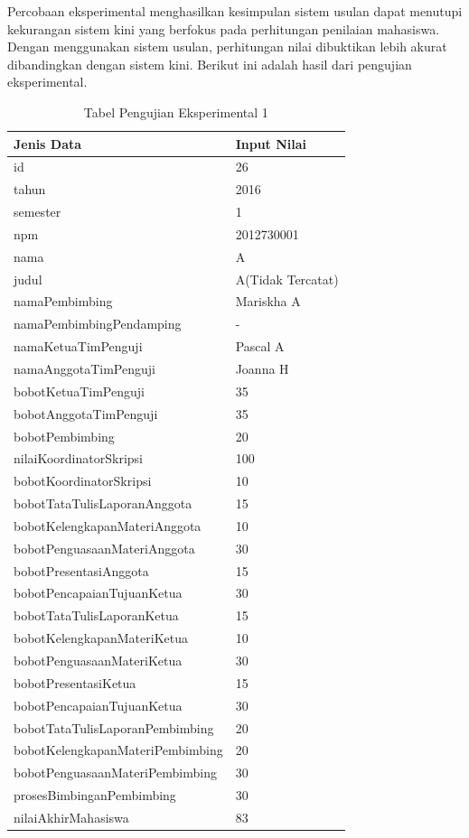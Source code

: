 	Percobaan eksperimental menghasilkan kesimpulan sistem usulan dapat menutupi kekurangan sistem kini yang berfokus pada perhitungan penilaian mahasiswa. Dengan menggunakan sistem usulan, perhitungan nilai dibuktikan lebih akurat dibandingkan dengan sistem kini. Berikut ini adalah hasil dari pengujian eksperimental.
	\begin{table}[H]
		\centering
		\caption{Tabel Pengujian Eksperimental 1}
		\begin{tabular}{| m{7cm} | m{5cm} |}
			\hline
			Jenis Data & Input Nilai\\
			\hline
			id & 26\\
			\hline
			tahun & 2016\\
			\hline
			semester & 1\\
			\hline
			npm & 2012730001\\
			\hline
			nama & A\\
			\hline
			judul & A(Tidak Tercatat) \\
			\hline
			namaPembimbing & Mariskha A\\
			\hline
			namaPembimbingPendamping & -\\
			\hline
			namaKetuaTimPenguji & Pascal A\\
			\hline
			namaAnggotaTimPenguji & Joanna H\\
			\hline
			bobotKetuaTimPenguji & 35\\
			\hline
			bobotAnggotaTimPenguji & 35\\
			\hline
			bobotPembimbing & 20\\
			\hline
			nilaiKoordinatorSkripsi & 100\\
			\hline
			bobotKoordinatorSkripsi & 10\\
			\hline
			bobotTataTulisLaporanAnggota & 15\\
			\hline
			bobotKelengkapanMateriAnggota & 10\\
			\hline
			bobotPenguasaanMateriAnggota & 30\\
			\hline
			bobotPresentasiAnggota & 15\\
			\hline
			bobotPencapaianTujuanKetua & 30\\
			\hline
			bobotTataTulisLaporanKetua & 15\\
			\hline
			bobotKelengkapanMateriKetua & 10\\
			\hline
			bobotPenguasaanMateriKetua & 30\\
			\hline
			bobotPresentasiKetua & 15\\
			\hline
			bobotPencapaianTujuanKetua & 30\\
			\hline
			bobotTataTulisLaporanPembimbing & 20\\
			\hline
			bobotKelengkapanMateriPembimbing &20\\
			\hline
			bobotPenguasaanMateriPembimbing & 30\\
			\hline
			prosesBimbinganPembimbing & 30\\
			\hline
			nilaiAkhirMahasiswa & 83\\
			\hline
		\end{tabular}
	\end{table}
